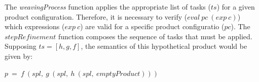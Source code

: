 \documentclass{acm_proc_article-sp}
\begin{document}
 The \emph{weavingProcess} function applies the appropriate list of tasks ($ts$) 
 for a given product configuration. Therefore, it is necessary to verify  ($eval\ pc\ (exp\ c)$) which expressions ($exp\ c$) are valid for a specific product configuratio ($pc$). The $stepRefinement$ function composes the sequence of tasks that must
 be applied. Supposing $ts = [h,g,f]$, the semantics of
 this hypothetical product would be given by:

 \begin{center}
 $ p\ =\ f\ (spl,\ g\ (spl,\ h\ (spl,\ emptyProduct)))  $
 \end{center}
\end{document}
